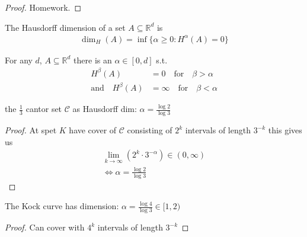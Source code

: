 \begin{proof}
	Homework.
\end{proof}

\begin{definition}
	The Hausdorff dimension of a set $A \subseteq \mathbb{R}^d$ is
	\begin{align*}
		\dim_{H} (A) = \inf\{\alpha \geq 0 : H^{\alpha} (A) = 0 \}
	\end{align*}
\end{definition}

\begin{lemma}
	For any $d$, $A \subseteq \mathbb{R}^d$ there is an $\alpha \in [0,d]$ s.t. 
	\begin{align*}
					H^{\beta} (A) &= 0 \quad \text{for} \quad  \beta > \alpha \\
		\text{and} \quad H^{\beta} (A) &= \infty \quad \text{for} \quad \beta < \alpha
	\end{align*} 
\end{lemma}


\begin{example}
	the $\frac{1}{3}$ cantor set $\mathcal{C}$ as Hausdorff dim: $\alpha = \frac{\log 2}{\log 3}$ 
	\begin{proof}
		At spet $K$ have cover of $\mathcal{C}$ consisting of $2^{k}$ intervals of length $3^{-k}$ this gives us 
		\begin{align*}
		\lim_{k \to \infty} (2^{k}\cdot 3^{-\alpha}) \in (0, \infty) \\
		\iff \alpha = \frac{\log 2}{\log 3}
		\end{align*} 
	\end{proof}
	
\end{example}

\begin{example}
	The Kock curve has dimension: $\alpha = \frac{\log 4}{\log 3} \in [1,2)$ 
	\begin{proof}
		Can cover with $4^{k}$ intervals of length $3^{-k}$
	\end{proof}
	
\end{example}

